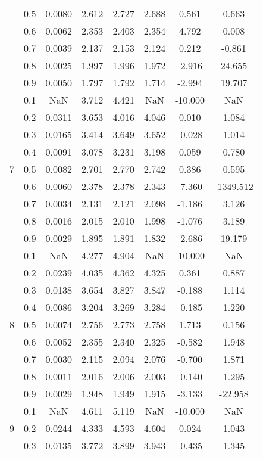 \documentclass[11pt,a4paper]{report}
\begin{document}
\begin{longtable}{ | c | c || c | c | c | c | c | c | }
 & 0.5 & 0.0080 & 2.612 & 2.727 & 2.688 & 0.561 & 0.663 \\
 & 0.6 & 0.0062 & 2.353 & 2.403 & 2.354 & 4.792 & 0.008 \\
 & 0.7 & 0.0039 & 2.137 & 2.153 & 2.124 & 0.212 & -0.861 \\
 & 0.8 & 0.0025 & 1.997 & 1.996 & 1.972 & -2.916 & 24.655 \\
 & 0.9 & 0.0050 & 1.797 & 1.792 & 1.714 & -2.994 & 19.707 \\
 \hline
\multirow{9}{*}{7} & 0.1 & NaN & 3.712 & 4.421 & NaN & -10.000 & NaN \\
 & 0.2 & 0.0311 & 3.653 & 4.016 & 4.046 & 0.010 & 1.084 \\
 & 0.3 & 0.0165 & 3.414 & 3.649 & 3.652 & -0.028 & 1.014 \\
 & 0.4 & 0.0091 & 3.078 & 3.231 & 3.198 & 0.059 & 0.780 \\
 & 0.5 & 0.0082 & 2.701 & 2.770 & 2.742 & 0.386 & 0.595 \\
 & 0.6 & 0.0060 & 2.378 & 2.378 & 2.343 & -7.360 & -1349.512 \\
 & 0.7 & 0.0034 & 2.131 & 2.121 & 2.098 & -1.186 & 3.126 \\
 & 0.8 & 0.0016 & 2.015 & 2.010 & 1.998 & -1.076 & 3.189 \\
 & 0.9 & 0.0029 & 1.895 & 1.891 & 1.832 & -2.686 & 19.179 \\
 \hline
\multirow{9}{*}{8} & 0.1 & NaN & 4.277 & 4.904 & NaN & -10.000 & NaN \\
 & 0.2 & 0.0239 & 4.035 & 4.362 & 4.325 & 0.361 & 0.887 \\
 & 0.3 & 0.0138 & 3.654 & 3.827 & 3.847 & -0.188 & 1.114 \\
 & 0.4 & 0.0086 & 3.204 & 3.269 & 3.284 & -0.185 & 1.220 \\
 & 0.5 & 0.0074 & 2.756 & 2.773 & 2.758 & 1.713 & 0.156 \\
 & 0.6 & 0.0052 & 2.355 & 2.340 & 2.325 & -0.582 & 1.948 \\
 & 0.7 & 0.0030 & 2.115 & 2.094 & 2.076 & -0.700 & 1.871 \\
 & 0.8 & 0.0011 & 2.016 & 2.006 & 2.003 & -0.140 & 1.295 \\
 & 0.9 & 0.0029 & 1.948 & 1.949 & 1.915 & -3.133 & -22.958 \\
 \hline
\multirow{9}{*}{9} & 0.1 & NaN & 4.611 & 5.119 & NaN & -10.000 & NaN \\
 & 0.2 & 0.0244 & 4.333 & 4.593 & 4.604 & 0.024 & 1.043 \\
 & 0.3 & 0.0135 & 3.772 & 3.899 & 3.943 & -0.435 & 1.345 \\

\end{longtable}
\end{document}

